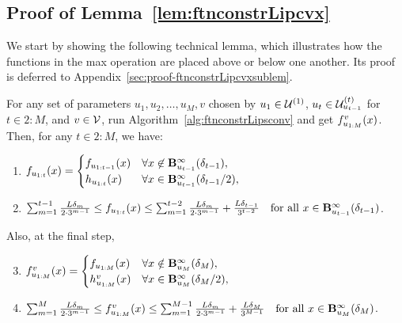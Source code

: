 \subsection{Proof of Lemma~\ref{lem:ftnconstrLipcvx}}
\label{sec:proof-ftnconstrLipcvx}
We start by showing the following technical lemma, 
which illustrates how the functions in the max operation are placed above or below one another.
Its proof is deferred to Appendix~\ref{sec:proof-ftnconstrLipcvxsublem}.
\begin{lemma}
	\label{sublem:ftnconstrLipcvx}
	For any set of parameters $u_1, u_2, \dots, u_M, v$ chosen by
	$u_1 \in \Uone$, $u_t \in \Utemp{t-1}{t}$ for $t \in 2:M$, and $v \in \V$,
	run Algorithm~\ref{alg:ftnconstrLipsconv} and get $\ftnuv(x)$.
	Then, for any $t \in 2:M$, we have: 
	\begin{enumerate}
		\item \label{itemsub:ftnconstrLipcvx-1} 
		$\ftnut(x) = \begin{cases}
		\ftnutmone(x) &\forall x \not\in \Binftmone, \\
		\ftninut(x)&\forall x\in \Binftmoneh,
		\end{cases}$
		\item \label{itemsub:ftnconstrLipcvx-3} $\sum_{m=1}^{t-1} \frac{L\delta_m}{2\cdot3^{m-1}}\leq\ftnut (x)\leq
		\sum_{m=1}^{t-2} \frac{L\delta_m}{2\cdot3^{m-1}} +\frac{L\delta_{t-1}}{3^{t-2}}
		\quad \text{for all } x \in \Binftmone$.
	\end{enumerate}
	Also, at the final step,
	\begin{enumerate}
		\setcounter{enumi}{2}
		\item \label{itemsub:ftnconstrLipcvx-4} $\ftnuv(x) = \begin{cases}
		\ftnuM(x) & \forall x\notin \BinfM, \\
		\ftninuv(x)&\forall x\in \BinfMh,
		\end{cases}$
		\item \label{itemsub:ftnconstrLipcvx-6} $\sum_{m=1}^{M} \frac{L\delta_m}{2\cdot3^{m-1}}\leq\ftnuv (x)\leq
		\sum_{m=1}^{M-1} \frac{L\delta_m}{2\cdot3^{m-1}} +\frac{L\delta_{M}}{3^{M-1}}
		\quad \text{for all } x \in \BinfM$.
	\end{enumerate}
\end{lemma}

